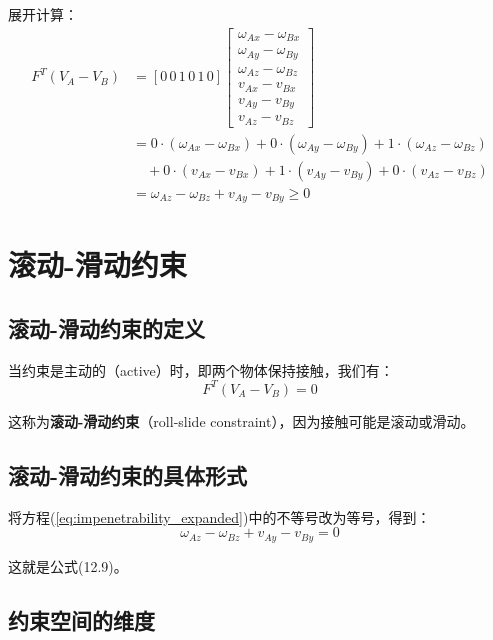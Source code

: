 \documentclass[12pt,a4paper]{article}
\begin{document}
展开计算：
\begin{align}
F^T (V_A - V_B) &= [0 \, 0 \, 1 \, 0 \, 1 \, 0] \begin{bmatrix} \omega_{Ax} - \omega_{Bx} \\ \omega_{Ay} - \omega_{By} \\ \omega_{Az} - \omega_{Bz} \\ v_{Ax} - v_{Bx} \\ v_{Ay} - v_{By} \\ v_{Az} - v_{Bz} \end{bmatrix} \\
&= 0 \cdot (\omega_{Ax} - \omega_{Bx}) + 0 \cdot (\omega_{Ay} - \omega_{By}) + 1 \cdot (\omega_{Az} - \omega_{Bz}) \\
&\quad + 0 \cdot (v_{Ax} - v_{Bx}) + 1 \cdot (v_{Ay} - v_{By}) + 0 \cdot (v_{Az} - v_{Bz}) \\
&= \omega_{Az} - \omega_{Bz} + v_{Ay} - v_{By} \geq 0
\label{eq:impenetrability_expanded}
\end{align}

\section{滚动-滑动约束}

\subsection{滚动-滑动约束的定义}

当约束是主动的（active）时，即两个物体保持接触，我们有：
\begin{equation}
F^T (V_A - V_B) = 0
\label{eq:roll_slide_general}
\end{equation}

这称为\textbf{滚动-滑动约束}（roll-slide constraint），因为接触可能是滚动或滑动。

\subsection{滚动-滑动约束的具体形式}

将方程(\ref{eq:impenetrability_expanded})中的不等号改为等号，得到：
\begin{equation}
\omega_{Az} - \omega_{Bz} + v_{Ay} - v_{By} = 0
\label{eq:12.9}
\end{equation}

这就是公式(12.9)。

\subsection{约束空间的维度}
\end{document}
